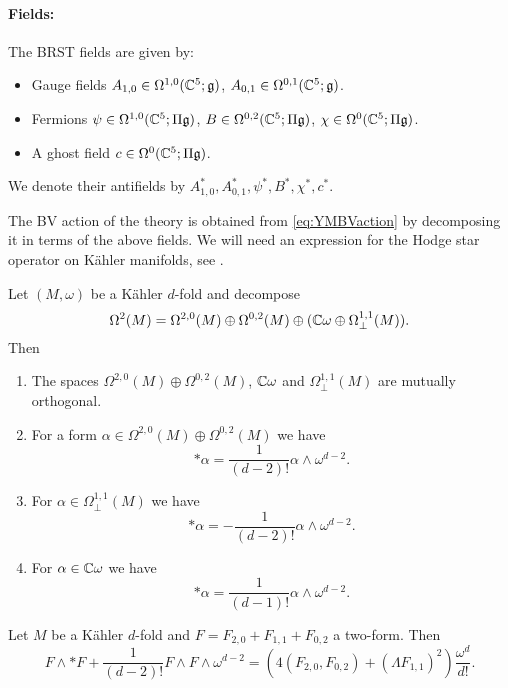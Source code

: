 \documentclass[10pt, oneside]{article}
\begin{document}
\paragraph{Fields:} The BRST fields are given by:
\begin{itemize}
\item Gauge fields $A_{1, 0}\in\Omega^{1, 0}(\mathbb C^5; \mathfrak{g})$, $A_{0, 1}\in\Omega^{0, 1}(\mathbb C^5; \mathfrak{g})$.
\item Fermions $\psi\in\Omega^{1, 0}(\mathbb C^5; \Pi\mathfrak{g})$, $B\in\Omega^{0, 2}(\mathbb C^5; \Pi\mathfrak{g})$, $\chi\in\Omega^0(\mathbb C^5; \Pi\mathfrak{g})$.
\item A ghost field $c\in\Omega^0(\mathbb C^5; \Pi\mathfrak{g})$.
\end{itemize}
We denote their antifields by $A_{1, 0}^*, A_{0, 1}^*, \psi^*, B^*, \chi^*, c^*$.

The BV action of the theory is obtained from \eqref{eq:YMBVaction} by decomposing it in terms of the above fields. We will need an expression for the Hodge star operator on K\"{a}hler manifolds, see \cite[Proposition 1.2.31]{Huybrechts}.

\begin{prop}
Let $(M, \omega)$ be a K\"{a}hler $d$-fold and decompose
\[\Omega^2(M) = \Omega^{2, 0}(M)\oplus \Omega^{0, 2}(M)\oplus (\mathbb C\omega\oplus \Omega^{1, 1}_\perp(M)).\]
Then
\begin{enumerate}
\item The spaces $\Omega^{2, 0}(M)\oplus \Omega^{0, 2}(M)$, $\mathbb C\omega$ and $\Omega^{1, 1}_\perp(M)$ are mutually orthogonal.

\item For a form $\alpha\in\Omega^{2, 0}(M)\oplus \Omega^{0, 2}(M)$ we have
\[\ast \alpha = \frac{1}{(d-2)!} \alpha\wedge \omega^{d-2}.\]

\item For $\alpha\in \Omega^{1, 1}_\perp(M)$ we have
\[\ast\alpha = -\frac{1}{(d-2)!} \alpha\wedge \omega^{d-2}.\]

\item For $\alpha\in\mathbb C\omega$ we have
\[\ast \alpha = \frac{1}{(d-1)!} \alpha\wedge \omega^{d-2}.\]
\end{enumerate}
\end{prop}

\begin{corollary} \label{Kahler_YM_term_cor}
Let $M$ be a K\"{a}hler $d$-fold and $F = F_{2, 0} + F_{1, 1} + F_{0, 2}$ a two-form. Then
\[F\wedge \ast F + \frac{1}{(d-2)!} F\wedge F\wedge \omega^{d-2} = \left(4(F_{2, 0}, F_{0, 2}) + (\Lambda F_{1, 1})^2\right) \frac{\omega^d}{d!}.\]
\end{corollary}
\end{document}
